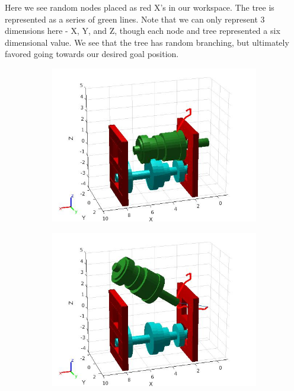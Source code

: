 \documentclass{article}
\begin{document}
Here we see random nodes placed as red X's in our workspace. The tree is represented as a series of green lines. Note that we can only represent 3 dimensions here - X, Y, and Z, though each node and tree represented a six dimensional value. We see that the tree has random branching, but ultimately favored going towards our desired goal position.

\begin{figure}[H]
    \centering
    \begin{subfigure}{0.4\textwidth}
        \centering
        \includegraphics[width = \textwidth]{img/pose_1.jpg}
    \end{subfigure}
    \begin{subfigure}{0.4\textwidth}
        \centering
        \includegraphics[width = \textwidth]{img/pose_2.jpg}

\end{subfigure}
\end{figure}
\end{document}

